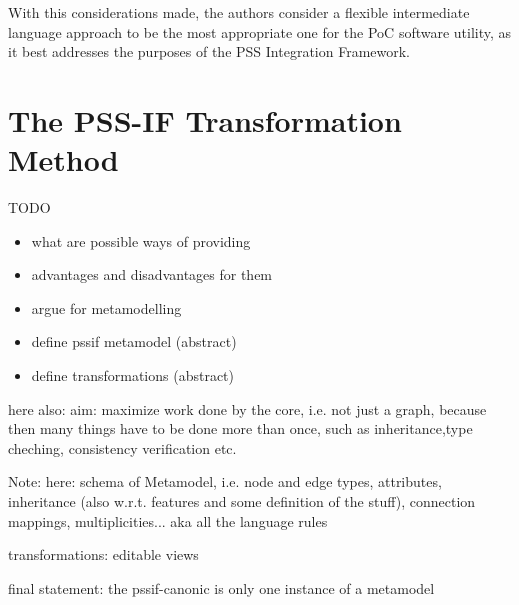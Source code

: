 With this considerations made, the authors consider a flexible intermediate language approach to be the most appropriate one for the PoC software utility, as it best addresses the purposes of the PSS Integration Framework.

\section{The PSS-IF Transformation Method}
\label{sec:approach:pssif}

TODO

\begin{itemize}
\item what are possible ways of providing
\item advantages and disadvantages for them
\item argue for metamodelling
\item define pssif metamodel (abstract)
\item define transformations (abstract)
\end{itemize}

here also: aim: maximize work done by the core, i.e. not just a graph, because then many things have to be done more than once, such as inheritance,type cheching, consistency verification etc.

Note: here: schema of Metamodel, i.e. node and edge types, attributes, inheritance (also w.r.t. features and some definition of the stuff), connection mappings, multiplicities... aka all the language rules

transformations: editable views

final statement: the pssif-canonic is only one instance of a metamodel